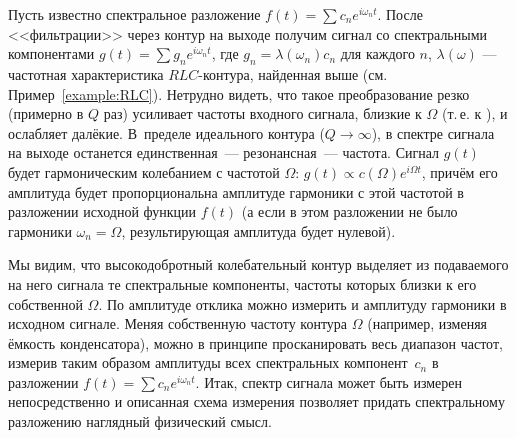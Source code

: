 Пусть известно спектральное разложение $f(t)=\sum c_n e^{i\omega_n t}$.
После <<фильтрации>> через контур на выходе получим сигнал со
спектральными компонентами $g(t)=\sum g_n e^{i\omega_n t}$,
где $g_n = \lambda(\omega_n) c_n$ для каждого $n$,
$\lambda(\omega)$ --- частотная характеристика $RLC$-контура, найденная
выше (см. Пример~\ref{example:RLC}). Нетрудно видеть, что такое преобразование резко
(примерно в $Q$ раз) усиливает частоты входного сигнала, близкие к
$\Omega$ (т.\,е. к ), и ослабляет далёкие.
В~пределе идеального контура ($Q\to \infty$), в спектре сигнала на выходе
останется единственная~--- резонансная~--- частота.
Сигнал $g(t)$ будет гармоническим колебанием с частотой $\Omega$:
$g(t) \propto c(\Omega) e^{i\Omega t}$,
причём его амплитуда будет пропорциональна амплитуде гармоники с этой
частотой в разложении исходной функции $f(t)$ (а если в этом разложении не было
гармоники $\omega_n=\Omega$, результирующая амплитуда будет нулевой).

Мы видим, что высокодобротный колебательный контур 
выделяет из подаваемого
на него сигнала те спектральные компоненты, частоты которых близки к
его собственной $\Omega$. По амплитуде отклика можно измерить и амплитуду
гармоники в исходном сигнале. Меняя собственную частоту контура $\Omega$
(например, изменяя ёмкость конденсатора), можно в принципе просканировать весь
диапазон частот, измерив таким образом амплитуды всех спектральных
компонент~$c_n$ в разложении $f(t)=\sum c_n e^{i\omega_n t}$. Итак,
спектр сигнала может быть измерен непосредственно и описанная схема измерения
позволяет придать спектральному разложению наглядный физический смысл.

